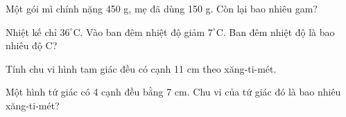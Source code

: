 \begin{ex}
Một gói mì chính nặng 450 g, mẹ đã dùng 150 g. Còn lại bao nhiêu gam?
\end{ex}

\begin{ex}
Nhiệt kế chỉ $36^\circ$C. Vào ban đêm nhiệt độ giảm $7^\circ$C. Ban đêm nhiệt độ là bao nhiêu độ C?
\end{ex}

\begin{ex}
Tính chu vi hình tam giác đều có cạnh 11 cm theo xăng-ti-mét.
\end{ex}

\begin{ex}
Một hình tứ giác có 4 cạnh đều bằng 7 cm. Chu vi của tứ giác đó là bao nhiêu xăng-ti-mét?
\end{ex}
